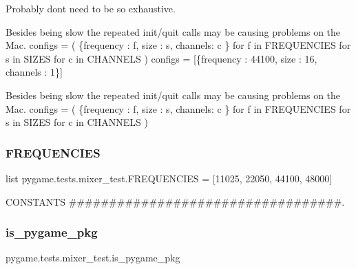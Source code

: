 Probably don\textquotesingle{}t need to be so exhaustive. 

Besides being slow the repeated init/quit calls may be causing problems on the Mac. configs = ( \{\textquotesingle{}frequency\textquotesingle{} \+: f, \textquotesingle{}size\textquotesingle{} \+: s, \textquotesingle{}channels\textquotesingle{}\+: c \} for f in F\+R\+E\+Q\+U\+E\+N\+C\+I\+ES for s in S\+I\+Z\+ES for c in C\+H\+A\+N\+N\+E\+LS ) configs = \mbox{[}\{\textquotesingle{}frequency\textquotesingle{} \+: 44100, \textquotesingle{}size\textquotesingle{} \+: 16, \textquotesingle{}channels\textquotesingle{} \+: 1\}\mbox{]}

Besides being slow the repeated init/quit calls may be causing problems on the Mac. configs = ( \{\textquotesingle{}frequency\textquotesingle{} \+: f, \textquotesingle{}size\textquotesingle{} \+: s, \textquotesingle{}channels\textquotesingle{}\+: c \} for f in F\+R\+E\+Q\+U\+E\+N\+C\+I\+ES for s in S\+I\+Z\+ES for c in C\+H\+A\+N\+N\+E\+LS ) \mbox{\label{namespacepygame_1_1tests_1_1mixer__test_aed9b177cf2c65bb3ed8eb5fb0abb8110}} 
\subsubsection{\texorpdfstring{F\+R\+E\+Q\+U\+E\+N\+C\+I\+ES}{FREQUENCIES}}
{\footnotesize\ttfamily list pygame.\+tests.\+mixer\+\_\+test.\+F\+R\+E\+Q\+U\+E\+N\+C\+I\+ES = \mbox{[}11025, 22050, 44100, 48000\mbox{]}}



C\+O\+N\+S\+T\+A\+N\+TS \#\#\#\#\#\#\#\#\#\#\#\#\#\#\#\#\#\#\#\#\#\#\#\#\#\#\#\#\#\#\#\#\#\#. 

\mbox{\label{namespacepygame_1_1tests_1_1mixer__test_a9c2ef67c620b572cc234c62fa75a25cc}} 
\subsubsection{\texorpdfstring{is\+\_\+pygame\+\_\+pkg}{is\_pygame\_pkg}}
{\footnotesize\ttfamily pygame.\+tests.\+mixer\+\_\+test.\+is\+\_\+pygame\+\_\+pkg}

